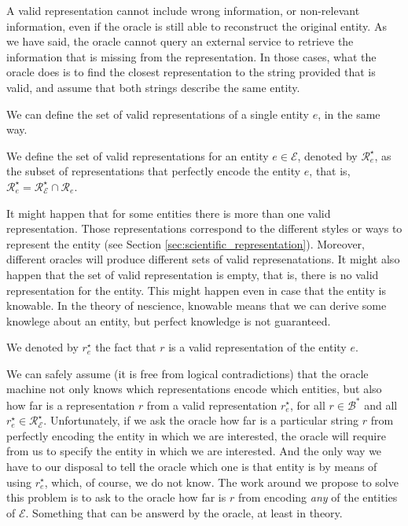 A valid representation cannot include wrong information, or non-relevant information, even if the oracle is still able to reconstruct the original entity. As we have said, the oracle cannot query an external service to retrieve the information that is missing from the representation. In those cases, what the oracle does is to find the closest representation to the string provided that is valid, and assume that both strings describe the same entity.

We can define the set of valid representations of a single entity $e$, in the same way.

\begin{definition}
We define the set of valid representations for an entity $e \in \mathcal{E}$, denoted by $\mathcal{R}^\star_e$, as the subset of representations that perfectly encode the entity $e$, that is, $\mathcal{R}^\star_e = \mathcal{R}^\star_\mathcal{E} \cap \mathcal{R}_e$.
\end{definition}

It might happen that for some entities there is more than one valid representation. Those representations correspond to the different styles or ways to represent the entity (see Section \ref{sec:scientific_representation}). Moreover, different oracles will produce different sets of valid represenatations. It might also happen that the set of valid representation is empty, that is, there is no valid representation for the entity. This might happen even in case that the entity is knowable. In the theory of nescience, knowable means that we can derive some knowlege about an entity, but perfect knowledge is not guaranteed.

\begin{notation}
We denoted by $r^\star_e$ the fact that $r$ is a valid representation of the entity $e$.
\end{notation}

We can safely assume (it is free from logical contradictions) that the oracle machine not only knows which representations encode which entities, but also how far is a representation $r$ from a valid representation $r^\star_e$, for all $r \in \mathcal{B}^\ast$ and all $r^\star_e \in \mathcal{R}^\star_\mathcal{E}$. Unfortunately, if we ask the oracle how far is a particular string $r$ from perfectly encoding the entity in which we are interested, the oracle will require from us to specify the entity in which we are interested. And the only way we have to our disposal to tell the oracle which one is that entity is by means of using $r^\star_e$, which, of course, we do not know. The work around we propose to solve this problem is to ask to the oracle how far is $r$ from encoding \emph{any} of the entities of $\mathcal{E}$. Something that can be answerd by the oracle, at least in theory.

